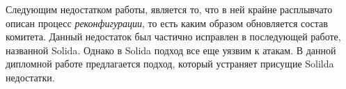 Следующим недостатком работы, является то, что в ней крайне расплывчато описан процесс \textit{реконфигурации}, то есть каким образом обновляется состав комитета. Данный недостаток был частично исправлен в последующей работе, названной Solida\cite{solida}. Однако в Solida подход все еще уязвим к атакам. В данной дипломной работе предлагается подход, который устраняет присущие Solilda недостатки.
 
\finishrelatedwork
